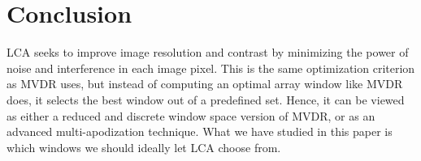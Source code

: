 \documentclass[10pt,journal,draftclsnofoot,onecolumn]{IEEEtran}
\let\MYoriglatexcaption\caption               %
\renewcommand{\caption}[2][\relax]{\MYoriglatexcaption[#2]{#2}}
\newcommand\Fig[1]{Fig.~\ref{#1}}
\newcommand\1{\vec 1}
\begin{document}
% 
% 


\section{Conclusion}\label{sec:conclusion}


LCA seeks to improve image resolution and contrast by minimizing the power of noise and interference in each image pixel. This is the same optimization criterion as MVDR uses, but instead of computing an optimal array window like MVDR does, it selects the best window out of a predefined set. Hence, it can be viewed as either a reduced and discrete window space version of MVDR, or as an advanced multi-apodization technique. What we have studied in this paper is which windows we should ideally let LCA choose from.
\end{document}
